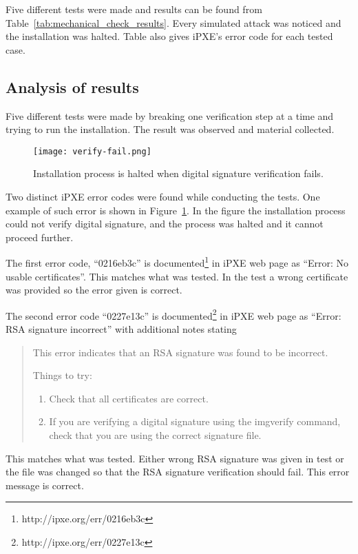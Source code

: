 Five different tests were made and results can be found from
Table~\ref{tab:mechanical_check_results}. Every simulated attack was
noticed and the installation was halted. Table also gives iPXE's error
code for each tested case.


\subsection{Analysis of results}

Five different tests were made by breaking one verification step at a
time and trying to run the installation. The result was observed and
material collected.

\begin{figure}[h]
  \caption{Installation process is halted when digital signature
    verification fails.\label{fig:verify-fail}}
  \texttt{[image: verify-fail.png]}
\end{figure}

Two distinct iPXE error codes were found while conducting the
tests. One example of such error is shown in
Figure~\ref{fig:verify-fail}. In the figure the installation process
could not verify digital signature, and the process was halted and it
cannot proceed further.

The first error code, ``0216eb3c'' is
documented\footnote{http://ipxe.org/err/0216eb3c} in iPXE web page as
``Error: No usable certificates''. This matches what was tested. In
the test a wrong certificate was provided so the error given is
correct.

The second error code ``0227e13c'' is
documented\footnote{http://ipxe.org/err/0227e13c} in iPXE web page as
``Error: RSA signature incorrect'' with additional notes stating

\begin{quote}
This error indicates that an RSA signature was found to be incorrect.

Things to try:

\begin{enumerate}
\item Check that all certificates are correct.
\item If you are verifying a digital signature using the imgverify
  command, check that you are using the correct signature file.
\end{enumerate}
\end{quote}

This matches what was tested. Either wrong RSA signature was given in
test or the file was changed so that the RSA signature verification
should fail. This error message is correct.

